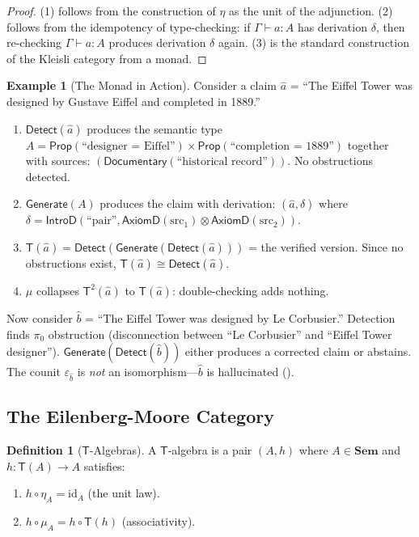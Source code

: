 \documentclass[11pt,a4paper]{article}
\theoremstyle{plain}
\theoremstyle{definition}
\newtheorem{definition}[theorem]{Definition}
\newtheorem{example}[theorem]{Example}
\theoremstyle{remark}
\newcommand{\Sem}{\mathbf{Sem}}
\newcommand{\id}{\mathrm{id}}
\newcommand{\Detect}{\mathsf{Detect}}
\newcommand{\Generate}{\mathsf{Generate}}
\newcommand{\SemanticT}{\mathsf{T}}
\begin{document}
\begin{proof}
(1) follows from the construction of $\eta$ as the unit of the adjunction. (2) follows from the idempotency of type-checking: if $\Gamma \vdash a : A$ has derivation $\delta$, then re-checking $\Gamma \vdash a : A$ produces derivation $\delta$ again. (3) is the standard construction of the Kleisli category from a monad.
\end{proof}

\begin{example}[The Monad in Action]\label{ex:monad-action}
Consider a claim $\hat{a}$ = ``The Eiffel Tower was designed by Gustave Eiffel and completed in 1889.''
\begin{enumerate}[nosep]
  \item $\Detect(\hat{a})$ produces the semantic type $A = \mathsf{Prop}(\text{``designer = Eiffel''}) \times \mathsf{Prop}(\text{``completion = 1889''})$ together with sources: $(\mathsf{Documentary}(\text{``historical record''}))$. No obstructions detected.
  \item $\Generate(A)$ produces the claim with derivation: $(\hat{a}, \delta)$ where $\delta = \mathsf{IntroD}(\text{``pair''}, \mathsf{AxiomD}(\text{src}_1) \otimes \mathsf{AxiomD}(\text{src}_2))$.
  \item $\SemanticT(\hat{a}) = \Detect(\Generate(\Detect(\hat{a})))$ = the verified version. Since no obstructions exist, $\SemanticT(\hat{a}) \cong \Detect(\hat{a})$.
  \item $\mu$ collapses $\SemanticT^2(\hat{a})$ to $\SemanticT(\hat{a})$: double-checking adds nothing.
\end{enumerate}

Now consider $\hat{b}$ = ``The Eiffel Tower was designed by Le Corbusier.'' Detection finds $\pi_0$ obstruction (disconnection between ``Le Corbusier'' and ``Eiffel Tower designer''). $\Generate(\Detect(\hat{b}))$ either produces a corrected claim or abstains. The counit $\varepsilon_{\hat{b}}$ is \emph{not} an isomorphism---$\hat{b}$ is hallucinated ().
\end{example}

\subsection{The Eilenberg-Moore Category}

\begin{definition}[$\SemanticT$-Algebras]\label{def:t-algebras}
A $\SemanticT$-algebra is a pair $(A, h)$ where $A \in \Sem$ and $h\colon \SemanticT(A) \to A$ satisfies:
\begin{enumerate}[nosep]
  \item $h \circ \eta_A = \id_A$ (the unit law).
  \item $h \circ \mu_A = h \circ \SemanticT(h)$ (associativity).
\end{enumerate}
\end{definition}
\end{document}
